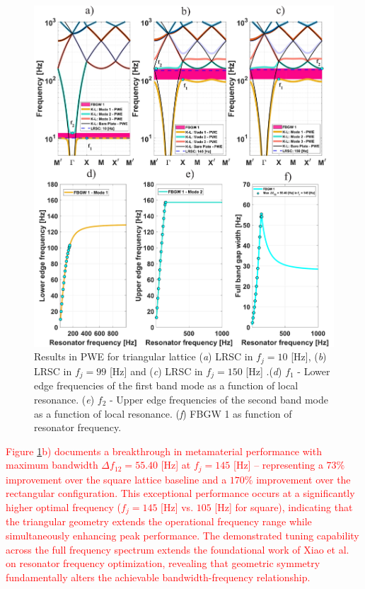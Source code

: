 \documentclass[review,numbers,sort&compress]{elsarticle}
\begin{document}
\newpage
\begin{figure}[htb]
	\centering
	\includegraphics[width=.9\textwidth]{2_3_disp_frf_trian.pdf}
	\caption{Results in PWE for triangular lattice (\textit{a}) LRSC in $f_j=10$ [Hz], (\textit{b}) LRSC in $f_j=99$ [Hz] and (\textit{c}) LRSC in $f_j=150$ [Hz] .(\textit{d}) $f_1$ - Lower edge frequencies of the first band mode as a function of local resonance. (\textit{e}) $f_2$ -  Upper edge frequencies of the second band mode as a function of local resonance. (\textit{f}) FBGW 1 as function of resonator frequency.}
	\label{pwe_disp_trian_all_res}
\end{figure}

\textcolor{red}{Figure \ref{pwe_disp_trian_all_res}b) documents a breakthrough in metamaterial performance with maximum bandwidth $\Delta f_{12} = 55.40$ [Hz] at $f_j = 145$ [Hz] – representing a $73\%$ improvement over the square lattice baseline and a $170\%$ improvement over the rectangular configuration. This exceptional performance occurs at a significantly higher optimal frequency ($f_j = 145$ [Hz] vs. $105$ [Hz] for square), indicating that the triangular geometry extends the operational frequency range while simultaneously enhancing peak performance. The demonstrated tuning capability across the full frequency spectrum extends the foundational work of Xiao et al.~\cite{Xiao_2012} on resonator frequency optimization, revealing that geometric symmetry fundamentally alters the achievable bandwidth-frequency relationship.}
\end{document}
